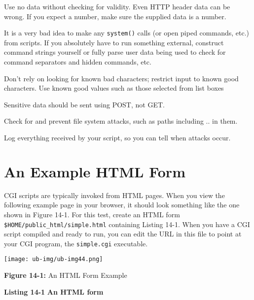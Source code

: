 \newenvironment{itemize*}%
  {\begin{itemize}%
    \setlength{\itemsep}{0pt}%
    \setlength{\parskip}{0pt}}%
  {\end{itemize}}
\begin{itemize*}
\item Use no data without checking for validity. Even HTTP header data
can be wrong. If you expect a number, make sure the supplied data
is a number.
\item It is a very bad idea to make any \texttt{system()} calls (or open
piped commands, etc.) from scripts. If you absolutely have to run something
external, construct command strings yourself or fully parse user data being
used to check for command separators and hidden commands, etc.
\item Don't rely on looking for known bad characters; restrict input to
known good characters. Use known good values such as those selected from
list boxes
\item Sensitive data should be sent using POST, not GET.
\item Check for and prevent file system attacks, such as
paths including .. in them.
\item Log everything received by your script, so you can
tell when attacks occur.
\end{itemize*}

\section{An Example HTML Form}

CGI scripts are typically invoked from HTML pages.
When you view the following example page in your browser,
it should look something like the one shown in Figure 14-1.
For this test, create an HTML form \texttt{\$HOME/public\_html/simple.html}
containing Listing 14-1. When you have a CGI script compiled and ready to
run, you can edit the URL in this file to point at your CGI program, the
\texttt{simple.cgi} executable.
\begin{center}
\texttt{[image: ub-img/ub-img44.png]}
\end{center}
{\sffamily\bfseries Figure 14-1:}
{\sffamily An HTML Form Example}


{\sffamily\bfseries Listing 14-1}
{\sffamily\bfseries An HTML form}

